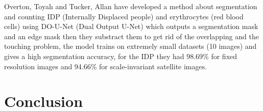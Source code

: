 Overton, Toyah and Tucker, Allan \textsuperscript{\cite{10.1007/978-3-030-44584-3_31}} have developed a method about segmentation and counting IDP (Internally Displaced people) and erythrocytes (red blood cells) using DO-U-Net (Dual Output U-Net) which outputs a segmentation mask and an edge mask then they substract them to get rid of the overlapping and the touching problem, the model trains on extremely small datasets (10 images) and gives a high segmentation accuracy, for the IDP they had 98.69\% for fixed resolution images and 94.66\% for scale-invariant satellite images.\\

\section{Conclusion}
\vspace{0.1in}
\hspace*{0.16in}
